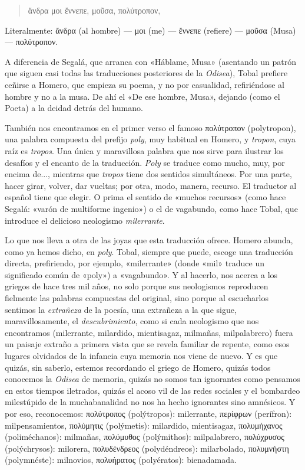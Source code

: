 \documentclass[11pt,a4paper]{article}
\newcommand{\gr}[1]{\foreignlanguage{greek}{#1}}
\begin{document}
\begin{verse}
\foreignlanguage{greek}{ἄνδρα μοι ἔννεπε, μοῦσα, πολύτροπον,}
\end{verse}

Literalmente: \gr{ἄνδρα} (al hombre) --- \gr{μοι} (me) --- \gr{ἔννεπε} (refiere) --- \gr{μοῦσα} (Musa) --- \gr{πολύτροπον}.

A diferencia de Segalá, que arranca con «Háblame, Musa» (asentando un patrón que siguen casi todas las traducciones posteriores de la \emph{Odisea}), Tobal prefiere ceñirse a Homero, que empieza su poema, y no por casualidad, refiriéndose al hombre y no a la musa. De ahí el «De ese hombre, Musa», dejando (como el Poeta) a la deidad detrás del humano. 

También nos encontramos en el primer verso el famoso \gr{πολύτροπον} (polytropon), una palabra compuesta del prefijo \emph{poly}, muy habitual en Homero, y \emph{tropon}, cuya raíz es \emph{tropos}. Una única y maravillosa palabra que nos sirve para ilustrar los desafíos y el encanto de la traducción. \emph{Poly} se traduce como mucho, muy, por encima de..., mientras que \emph{tropos} tiene dos sentidos simultáneos. Por una parte, hacer girar, volver, dar vueltas; por otra, modo, manera, recurso. El traductor al español tiene que elegir. O prima el sentido de «muchos recursos» (como hace Segalá: «varón de multiforme ingenio») o el de vagabundo, como hace Tobal, que introduce el delicioso neologismo \emph{milerrante}.  

Lo que nos lleva a otra de las joyas que esta traducción ofrece. Homero abunda, como ya hemos dicho, en \emph{poly}. Tobal, siempre que puede, escoge una traducción directa, prefiriendo, por ejemplo, «milerrante» (donde «mil» traduce un significado común de «poly») a «vagabundo». Y al hacerlo, nos acerca a los griegos de hace tres mil años, no solo porque sus neologismos reproducen fielmente las palabras compuestas del original, sino porque al escucharlos sentimos la \emph{extrañeza} de la poesía, una extrañeza a la que sigue, maravillosamente, el \emph{descubrimiento}, como si cada neologismo que nos encontramos (milerrante, milardido, mientisagaz, milmañas, milpalabrero) fuera un paisaje extraño a primera vista que se revela familiar de repente, como esos lugares olvidados de la infancia cuya memoria nos viene de nuevo. Y es que quizás, sin saberlo, estemos recordando el griego de Homero, quizás todos conocemos la \emph{Odisea} de memoria, quizás no somos tan ignorantes como pensamos en estos tiempos iletrados, quizás el acoso vil de las redes sociales y el bombardeo milestúpido de la muchabanalidad no nos ha hecho ignorantes sino amnésicos. Y por eso, reconocemos: \gr{πολύτροπος} (polýtropos): milerrante, \gr{περίφρων} (perífron): milpensamientos, \gr{πολύμητις} (polýmetis): milardido, mientisagaz, \gr{πολυμήχανος} (poliméchanos): milmañas, \gr{πολύμυθος} (polýmithos): milpalabrero, \gr{πολύχρυσος} (polýchrysos): milorera, \gr{πολυδένδρεος} (polydéndreos): milarbolado, \gr{πολυμνήστη} (polymnéste): milnovios, \gr{πολυήρατος} (polyératos): bienadamada.
\end{document}
